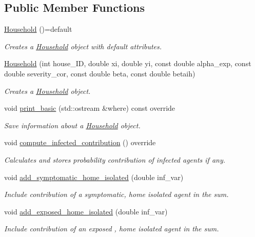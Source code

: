 \subsection*{Public Member Functions}
\begin{DoxyCompactItemize}
\item 
\hyperlink{classHousehold_a806512a49b82de676b263b47c7717391}{Household} ()=default
\begin{DoxyCompactList}\small\item\em Creates a \hyperlink{classHousehold}{Household} object with default attributes. \end{DoxyCompactList}\item 
\hyperlink{classHousehold_a0f96ac02e6cb0ecc7fd7a291af93c05e}{Household} (int house\+\_\+\+ID, double xi, double yi, const double alpha\+\_\+exp, const double severity\+\_\+cor, const double beta, const double betaih)
\begin{DoxyCompactList}\small\item\em Creates a \hyperlink{classHousehold}{Household} object. \end{DoxyCompactList}\item 
void \hyperlink{classHousehold_a9bf27cca25dea519945c8740b9793ff6}{print\+\_\+basic} (std\+::ostream \&where) const override
\begin{DoxyCompactList}\small\item\em Save information about a \hyperlink{classHousehold}{Household} object. \end{DoxyCompactList}\item 
void \hyperlink{classHousehold_ae063737d06a7a50aa9b780d7066c1c88}{compute\+\_\+infected\+\_\+contribution} () override
\begin{DoxyCompactList}\small\item\em Calculates and stores probability contribution of infected agents if any. \end{DoxyCompactList}\item 
void \hyperlink{classHousehold_ac2e5bde05d678a9ba853ddb9cf00ce3d}{add\+\_\+symptomatic\+\_\+home\+\_\+isolated} (double inf\+\_\+var)
\begin{DoxyCompactList}\small\item\em Include contribution of a symptomatic, home isolated agent in the sum. \end{DoxyCompactList}\item 
void \hyperlink{classHousehold_a28b12a90e592c6d3b1e9ac333e3d54d8}{add\+\_\+exposed\+\_\+home\+\_\+isolated} (double inf\+\_\+var)
\begin{DoxyCompactList}\small\item\em Include contribution of an exposed , home isolated agent in the sum. \end{DoxyCompactList}\end{DoxyCompactItemize}
